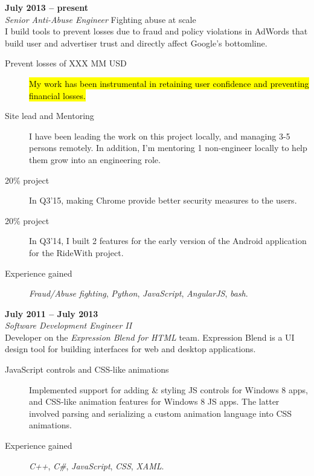 \documentclass[margin,line]{resume}
\begin{document}
\begin{resume}
	 \hfill \textbf{July 2013 -- present}\\%
	\textsl{Senior Anti-Abuse Engineer} \hfill Fighting abuse at scale\\
    I build tools to prevent losses due to fraud and policy violations in AdWords that build user and advertiser trust and directly affect Google's bottomline.
	\begin{description}
	\item [Prevent losses of XXX MM USD] \hl{My work has been instrumental in retaining user confidence and preventing financial losses.}
	\item [Site lead and Mentoring] I have been leading the work on this project locally, and managing 3-5 persons remotely. In addition, I'm mentoring 1 non-engineer locally to help them grow into an engineering role.
	\item [20\% project] In Q3'15, making Chrome provide better security measures to the users. 
	\item [20\% project] In Q3'14, I built 2 features for the early version of the Android application for the RideWith project.
	\item [Experience gained] \textit{Fraud/Abuse fighting}, \textit{Python}, \textit{JavaScript}, \textit{AngularJS}, \textit{bash}.
    \end{description}

     \hfill \textbf{July 2011 -- July 2013}\\%
	\textsl{Software Development Engineer II}\\
	Developer on the \textit{Expression Blend for HTML} team. Expression Blend is a UI design tool for building interfaces for web and desktop applications.
	\begin{description}
	\item [JavaScript controls and CSS-like animations] Implemented support for adding \& styling JS controls for Windows 8 apps, and CSS-like animation features for Windows 8 JS apps. The latter involved parsing and serializing a custom animation language into CSS animations.
	\item [Experience gained] \textit{C++}, \textit{C\#}, \textit{JavaScript}, \textit{CSS}, \textit{XAML}.
    \end{description}


\end{resume}
\end{document}
